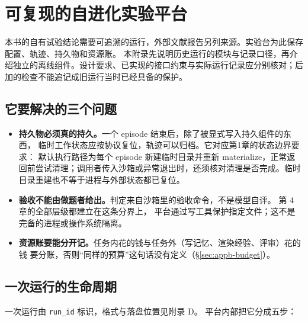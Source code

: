 \chapter{可复现的自进化实验平台}
\label{app:lab}

本书的自有试验结论需要可追溯的运行，外部文献报告另列来源。实验台为此保存配置、轨迹、持久物和资源账。
本附录先说明历史运行的模块与记录口径，再介绍独立的离线组件。设计要求、已实现的接口约束与实际运行记录应分别核对；后加的检查不能追记成旧运行当时已经具备的保护。

\section{它要解决的三个问题}

\begin{itemize}
  \item \textbf{持久物必须真的持久。}一个 episode 结束后，除了被显式写入持久组件的东西，
        临时工作状态应按协议复位，轨迹可以归档。它对应第1章的状态边界要求：
        默认执行路径为每个 episode 新建临时目录并重新 materialize，正常返回前尝试清理；调用者传入沙箱或异常退出时，还须核对清理是否完成。临时目录重建也不等于进程与外部状态都已复位。
  \item \textbf{验收不能由做题者给出。}判定来自沙箱里的验收命令，不是模型自评。
        第 4 章的全部层级都建立在这条分界上，
        平台通过写工具保护指定文件；这不是完备的进程或操作系统隔离。
  \item \textbf{资源账要能分开记。}任务内花的钱与任务外（写记忆、渲染经验、评审）花的钱
        要分账，否则``同样的预算''这句话没有定义（§\ref{sec:appb-budget}）。
\end{itemize}

\section{一次运行的生命周期}
\label{sec:appb-lifecycle}

一次运行由 \texttt{run\_id} 标识，格式与落盘位置见附录 D。
平台内部把它分成五步：

